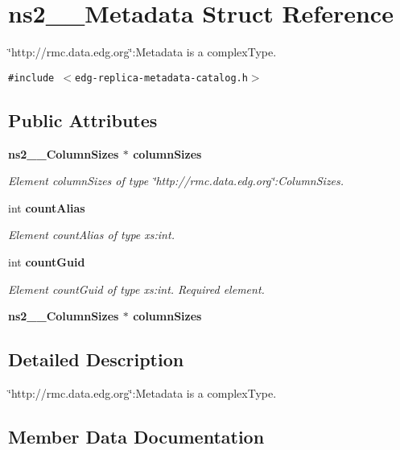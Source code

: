 \section{ns2\_\-\_\-Metadata Struct Reference}
\label{structns2____Metadata}
\char`\"{}http://rmc.data.edg.org\char`\"{}:Metadata is a complex\-Type.  


{\tt \#include $<$edg-replica-metadata-catalog.h$>$}

\subsection*{Public Attributes}
\begin{CompactItemize}
\item 
\bf{ns2\_\-\_\-Column\-Sizes} $\ast$ \bf{column\-Sizes}
\begin{CompactList}\small\item\em Element column\-Sizes of type \char`\"{}http://rmc.data.edg.org\char`\"{}:Column\-Sizes. \item\end{CompactList}\item 
int \bf{count\-Alias}
\begin{CompactList}\small\item\em Element count\-Alias of type xs:int. \item\end{CompactList}\item 
int \bf{count\-Guid}\label{structns2____Metadata_580196ca30d881f2a865b2c153586a3d}

\begin{CompactList}\small\item\em Element count\-Guid of type xs:int. Required element. \item\end{CompactList}\item 
\bf{ns2\_\-\_\-Column\-Sizes} $\ast$ \textbf{column\-Sizes}\label{structns2____Metadata_de394d8161c595d9c7e0c546059a39e9}

\end{CompactItemize}


\subsection{Detailed Description}
\char`\"{}http://rmc.data.edg.org\char`\"{}:Metadata is a complex\-Type. 



\subsection{Member Data Documentation}
